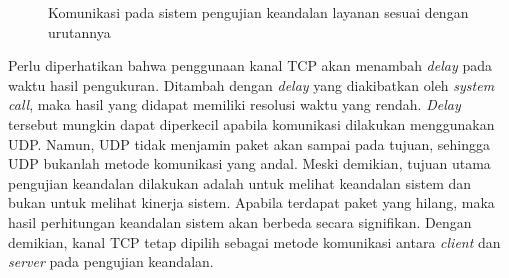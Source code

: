 \begin{figure}[!ht]
	\centering
	\vspace{20pt}
	\caption[Komunikasi pada sistem pengujian keandalan layanan]{Komunikasi pada sistem pengujian keandalan layanan sesuai dengan urutannya}
	\label{figure:server_client_testing_impl}
\end{figure}

Perlu diperhatikan bahwa penggunaan kanal TCP akan menambah \textit{delay} pada waktu hasil
pengukuran.  Ditambah dengan \textit{delay} yang diakibatkan oleh \textit{system call}, maka
hasil yang didapat memiliki resolusi waktu yang rendah.  \textit{Delay} tersebut mungkin dapat
diperkecil apabila komunikasi dilakukan menggunakan UDP. Namun, UDP tidak menjamin paket akan
sampai pada tujuan, sehingga UDP bukanlah metode komunikasi yang andal. Meski demikian, tujuan
utama pengujian keandalan dilakukan adalah untuk melihat keandalan sistem dan bukan untuk
melihat kinerja sistem. Apabila terdapat paket yang hilang, maka hasil perhitungan keandalan
sistem akan berbeda secara signifikan. Dengan demikian, kanal TCP tetap dipilih sebagai metode
komunikasi antara \textit{client} dan \textit{server} pada pengujian keandalan.

